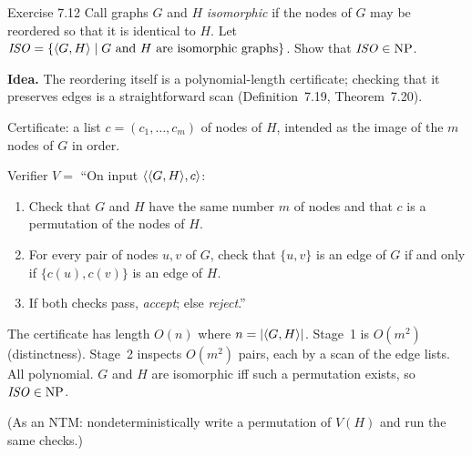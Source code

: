 \begin{question}{Exercise 7.12}
Call graphs $G$ and $H$ \emph{isomorphic} if the nodes of $G$ may be reordered so that it is identical to $H$. Let $\mathit{ISO}=\{\langle G,H\rangle\mid \text{$G$ and $H$ are isomorphic graphs}\}$. Show that $\mathit{ISO}\in\mathrm{NP}$.
\end{question}
\begin{soln}
\textbf{Idea.} The reordering itself is a polynomial-length certificate; checking that it preserves edges is a straightforward scan (Definition~7.19, Theorem~7.20).

Certificate: a list $c=(c_1,\dots,c_m)$ of nodes of $H$, intended as the image of the $m$ nodes of $G$ in order.

Verifier $V=$ ``On input $\langle \langle G,H\rangle,c\rangle$:
\begin{enumerate}
\item Check that $G$ and $H$ have the same number $m$ of nodes and that $c$ is a permutation of the nodes of $H$.
\item For every pair of nodes $u,v$ of $G$, check that $\{u,v\}$ is an edge of $G$ if and only if $\{c(u),c(v)\}$ is an edge of $H$.
\item If both checks pass, \emph{accept}; else \emph{reject}.''
\end{enumerate}

The certificate has length $O(n)$ where $n=|\langle G,H\rangle|$. Stage~1 is $O(m^2)$ (distinctness). Stage~2 inspects $O(m^2)$ pairs, each by a scan of the edge lists. All polynomial. $G$ and $H$ are isomorphic iff such a permutation exists, so $\mathit{ISO}\in\mathrm{NP}$.

(As an NTM: nondeterministically write a permutation of $V(H)$ and run the same checks.)
\end{soln}

